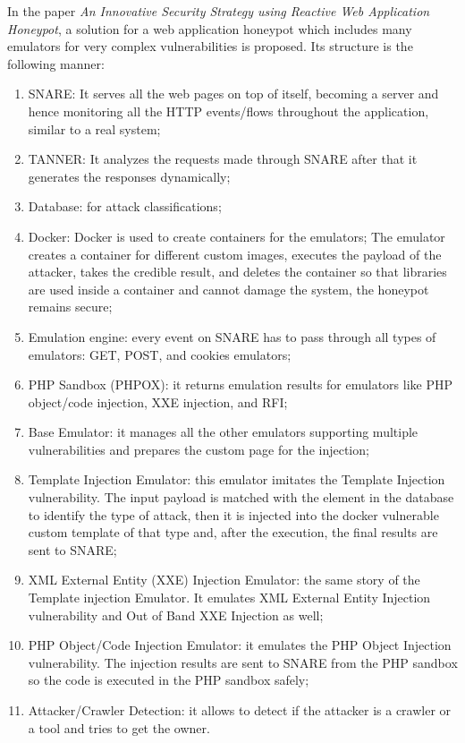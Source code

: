 In the paper \textit{An Innovative Security Strategy using Reactive Web Application Honeypot}\cite{https://doi.org/10.48550/arxiv.2105.04773}, a solution for a web application honeypot which includes many emulators for very complex vulnerabilities is proposed. Its structure is the following manner:
\begin{enumerate}
\item SNARE: It serves all the web pages on top of itself, becoming a server and hence monitoring all the HTTP events/flows throughout the application, similar to a real system;
\item TANNER: It analyzes the requests made through SNARE after that it generates the responses dynamically;
\item Database: for attack classifications;
\item Docker: Docker is used to create containers for the emulators;
The emulator creates a container for different custom images, executes the payload of the attacker, takes the credible result, and deletes the container so that libraries are used inside a container and cannot damage the system, the honeypot remains secure;
\item Emulation engine: every event on SNARE has to pass through all types of emulators: GET, POST, and cookies emulators;
\item PHP Sandbox (PHPOX): it returns emulation results for emulators like PHP object/code injection, XXE injection, and RFI;
\item Base Emulator: it manages all the other emulators supporting multiple vulnerabilities and prepares the custom page for the injection;
\item Template Injection Emulator: this emulator imitates the Template Injection vulnerability. The input payload is matched with the element in the database to identify the type of attack, then it is injected into the docker vulnerable custom template of that type and, after the execution, the final results are sent to SNARE;
\item XML External Entity (XXE) Injection Emulator: the same story of the Template injection Emulator. It emulates XML External Entity Injection vulnerability and Out of Band XXE Injection as well;
\item PHP Object/Code Injection Emulator: it emulates the PHP Object Injection vulnerability. The injection results are sent to SNARE from the PHP sandbox so the code is executed in  the PHP sandbox safely;
\item Attacker/Crawler Detection: it allows to detect if the attacker is a crawler or a tool and tries to get the owner.
\end{enumerate}
